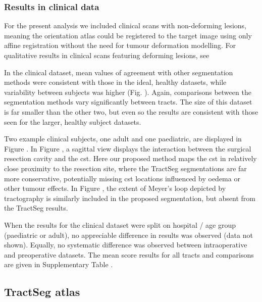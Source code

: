 \subsubsection{Results in clinical data}

For the present analysis we included clinical scans with non-deforming lesions, meaning the orientation atlas could be registered to the target image using only affine registration without the need for tumour deformation modelling.
For qualitative results in clinical scans featuring deforming lesions, see \textcite{Young2022}

In the clinical dataset, mean values of agreement with other segmentation methods were consistent with those in the ideal, healthy datasets, while variability between subjects was higher (Fig. ).
Again, comparisons between the segmentation methods vary significantly between tracts.
The size of this dataset is far smaller than the other two, but even so the results are consistent with those seen for the larger, healthy subject datasets.

Two example clinical subjects, one adult and one paediatric, are displayed in Figure .
In Figure , a sagittal view displays the interaction between the surgical resection cavity and the \gls{cst}.
Here our proposed method maps the \gls{cst} in relatively close proximity to the resection site, where the TractSeg segmentations are far more conservative, potentially missing \gls{cst} locations influenced by oedema or other tumour effects.
In Figure , the extent of Meyer's loop depicted by tractography is similarly included in the proposed segmentation, but absent from the TractSeg results.

When the results for the clinical dataset were split on hospital / age group (paediatric or adult), no appreciable difference in results was observed (data not shown).
Equally, no systematic difference was observed between intraoperative and preoperative datasets.
The mean score results for all tracts and comparisons are given in Supplementary Table .


\subsection{TractSeg atlas}

